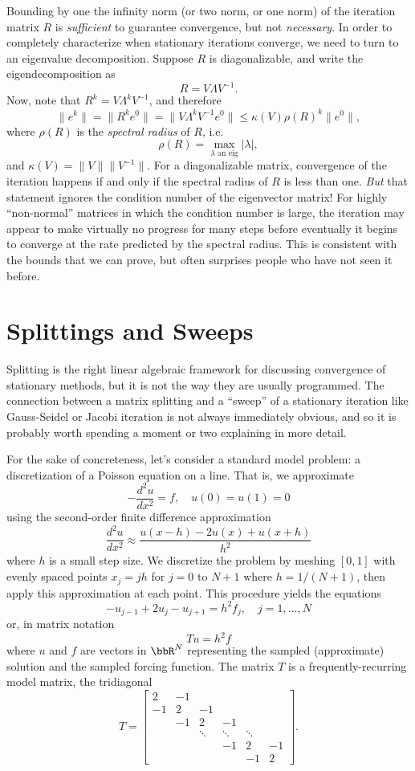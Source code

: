 \documentclass[12pt, leqno]{article}
\begin{document}
Bounding by one the infinity norm (or two norm, or one norm) of the
iteration matrix $R$ is {\em sufficient} to guarantee convergence,
but not {\em necessary}.  In order to completely characterize when
stationary iterations converge, we need to turn to an eigenvalue
decomposition.  Suppose $R$ is diagonalizable, and write the
eigendecomposition as
\[
  R = V \Lambda V^{-1}.
\]
Now, note that $R^k = V \Lambda^k V^{-1}$, and therefore
\[
  \|e^k\| = \|R^k e^0\| = \|V \Lambda^k V^{-1} e^0\| \leq \kappa(V)
  \rho(R)^k \|e^0\|,
\]
where $\rho(R)$ is the {\em spectral radius} of $R$, i.e.
\[
  \rho(R) = \max_{\lambda \mbox{ an eig}} |\lambda|,
\]
and $\kappa(V) = \|V\| \|V^{-1}\|$.  For a diagonalizable matrix,
convergence of the iteration happens if and only if the spectral
radius of $R$ is less than one.  {\em But} that statement ignores
the condition number of the eigenvector matrix!  For highly
``non-normal'' matrices in which the condition number is large,
the iteration may appear to make virtually no progress for many steps
before eventually it begins to converge at the rate predicted by
the spectral radius.  This is consistent with the bounds that we
can prove, but often surprises people who have not seen it before.

\section{Splittings and Sweeps}

Splitting is the right linear algebraic framework for discussing
convergence of stationary methods, but it is not the way they are
usually programmed.  The connection between a matrix splitting and a
``sweep'' of a stationary iteration like Gauss-Seidel or Jacobi
iteration is not always immediately obvious, and so it is probably
worth spending a moment or two explaining in more detail.

For the sake of concreteness, let's consider a standard model problem:
a discretization of a Poisson equation on a line.  That is, we
approximate
\[
  -\frac{d^2 u}{dx^2} = f, \quad u(0) = u(1) = 0
\]
using the second-order finite difference approximation
\[
  \frac{d^2 u}{dx^2} \approx \frac{u(x-h)-2u(x)+u(x+h)}{h^2}
\]
where $h$ is a small step size.  We discretize the problem by meshing
$[0,1]$ with evenly spaced points $x_j = jh$ for $j = 0$
to $N+1$ where $h = 1/(N+1)$, then apply this approximation at each
point.  This procedure yields the equations
\[
  -u_{j-1}+2u_j-u_{j+1} = h^2 f_j, \quad j = 1, \ldots, N
\]
or, in matrix notation
\[
  Tu = h^2 f
\]
where $u$ and $f$ are vectors in $\bbR^N$ representing the sampled
(approximate) solution and the sampled forcing function.  The matrix
$T$ is a frequently-recurring model matrix, the tridiagonal
\[
T =
\begin{bmatrix}
   2 & -1 \\
  -1 &  2 & -1 \\
     & -1 &  2 & -1 \\
     &    & \ddots & \ddots & \ddots \\
     &    &        & -1 & 2 & -1 \\
     &    &        &    & -1 & 2
\end{bmatrix}.
\]
\end{document}
